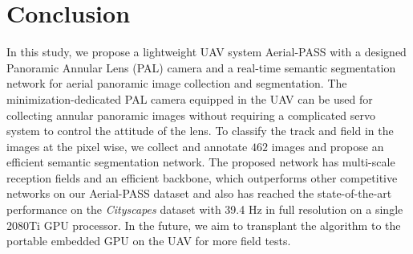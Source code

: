 \documentclass[letterpaper, 10 pt, conference]{ieeeconf}
\begin{document}
\section{Conclusion}

In this study, we propose a lightweight UAV system Aerial-PASS with a designed Panoramic Annular Lens (PAL) camera and a real-time semantic segmentation network for aerial panoramic image collection and segmentation.
The minimization-dedicated PAL camera equipped in the UAV can be used for collecting annular panoramic images without requiring a complicated servo system to control the attitude of the lens.
To classify the track and field in the images at the pixel wise, we collect and annotate $462$ images and propose an efficient semantic segmentation network.
The proposed network has multi-scale reception fields and an efficient backbone, which outperforms other competitive networks on our Aerial-PASS dataset and also has reached the state-of-the-art performance on the \emph{Cityscapes} dataset with 39.4 Hz in full resolution on a single 2080Ti GPU processor.
In the future, we aim to transplant the algorithm to the portable embedded GPU on the UAV for more field tests.



\end{document}
